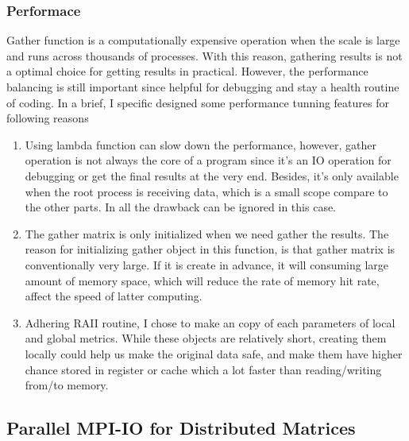 \subsubsection{Performace} \label{SEC:GATHER_PERFORMANCE}
Gather function is a computationally expensive operation when the scale is large and runs across thousands of processes. 
With this reason, gathering results is not a optimal choice for getting results in practical.
However, the performance balancing is still important since helpful for debugging and stay a health routine of coding.
In a brief, I specific designed some performance tunning features for following reasons
\begin{enumerate}
  \item Using lambda function can slow down the performance, however, gather operation is not always the core of a 
  program since it's an IO operation for debugging or get the final results at the very end. 
  Besides, it's only available when the root process is receiving data, which is a small scope compare to the other parts.
  In all the drawback can be ignored in this case.
  \item The gather matrix is only initialized when we need gather the results.
  The reason for initializing gather object in this function, is that gather matrix is conventionally very large. 
  If it is create in advance, it will consuming large amount of memory space, which will reduce the rate of memory hit rate, 
  affect the speed of latter computing.
  \item Adhering RAII routine, I chose to make an copy of each parameters of local and global metrics. 
  While these objects are relatively short, creating them locally could help us make the original data safe, 
  and make them have higher chance stored in register or cache which a lot faster than reading/writing from/to memory.
\end{enumerate}

\subsection{Parallel MPI-IO for Distributed Matrices}

